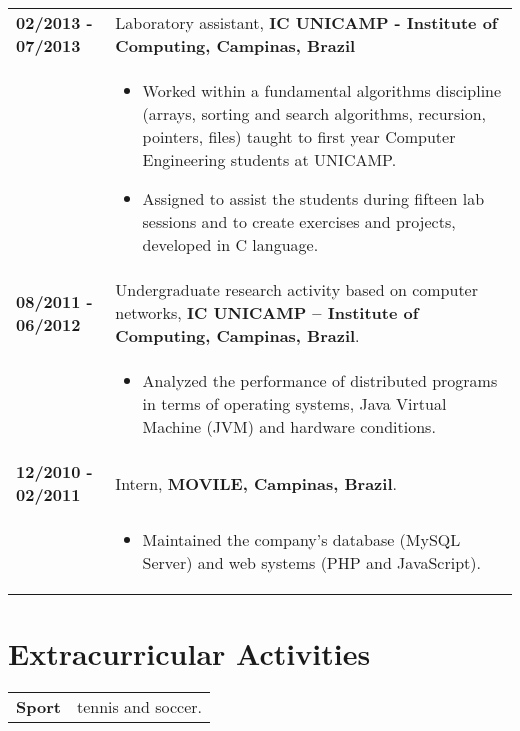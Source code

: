 \documentclass[10pt, a4paper]{article}
\begin{document}
\begin{tabular}{p{} p{}}
 \textbf{02/2013 - 07/2013}   & Laboratory assistant, \textbf{IC UNICAMP -
 Institute of Computing, Campinas, Brazil} \\
 & \vspace{-12pt} 
	 \begin {itemize} 
	   	\item Worked within a fundamental algorithms discipline (arrays, sorting and search algorithms, recursion, pointers, files)
	 taught to first year Computer Engineering students at UNICAMP. \vspace{-4pt}
	 	\item Assigned to assist the students during fifteen lab sessions and to
	 create exercises and projects, developed in C language.
	 \end{itemize} \\

 \textbf{08/2011 - 06/2012} & Undergraduate research activity based on computer
 networks, \textbf{IC UNICAMP – Institute of Computing, Campinas, Brazil}.   \\
 & 
 	\vspace{-12pt}
	\begin{itemize}
   	\item Analyzed the performance of distributed programs in terms of
 		operating systems, Java Virtual Machine (JVM) and hardware conditions.
 	\end{itemize} \\
 
 
 \textbf{12/2010 - 02/2011} & Intern, \textbf{MOVILE, Campinas, Brazil}.\\
 &
 \vspace{-12pt}
	\begin{itemize} 
 	\item Maintained the company’s database (MySQL Server) and web systems (PHP
 	and JavaScript).  
	\end {itemize} 	\\
 
\end{tabular}


\section{Extracurricular Activities}

\begin{tabular}{p{} p{}}

\textbf{Sport} & tennis and soccer. \\ 

\end{tabular}

\end{document}

